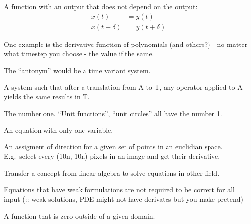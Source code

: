 \begin{definition}\label{TIS}
    A function with an output that does not depend on the output:
    \begin{align}
        x(t) &= y(t) \\
        x(t + \delta) &= y(t + \delta)
    \end{align}

    One example is the derivative function of polynomials (and others?) -
    no matter what timestep you choose - the value if the same.

    The ``antonym'' would be a time variant system.
\end{definition}

\begin{definition}
    A system such that after a translation from A to T, any operator
    applied to A yields the same results in T.
\end{definition}

\begin{definition}[Unity]
    The number one. ``Unit functions'', ``unit circles'' all have the number 1.
\end{definition}

\begin{definition}[Univariate]
    An equation with only one variable.
\end{definition}

\begin{definition}\label{vectorfield}
    An assigment of direction for a given set of points in an euclidian space.
    E.g.\ select every (10n, 10n) pixels in an image and get their derivative.
\end{definition}

\begin{definition}
    Transfer a concept from linear algebra to solve equations in other field.

    Equations that have weak formulations are not required to be correct for
    all input (:: weak solutions, PDE might not have derivates but you make pretend)

\end{definition}

\begin{definition}
    A function that is zero outside of a given domain.
\end{definition}
